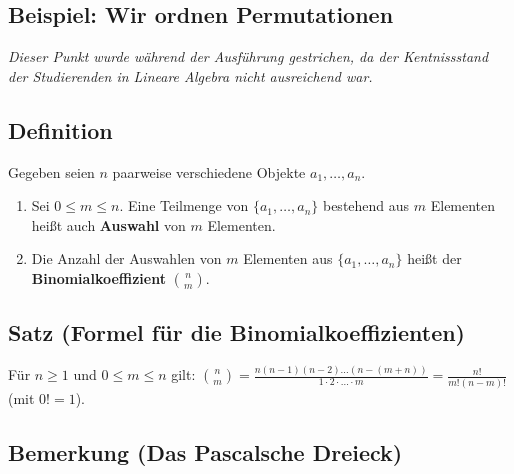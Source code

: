 	
\subsection[Beispiel]{Beispiel: Wir ordnen Permutationen}

	\textit{Dieser Punkt wurde während der Ausführung gestrichen, 
	da der Kentnissstand der Studierenden in Lineare Algebra nicht ausreichend war.}
	
	
\subsection{Definition}

	Gegeben seien $n$ paarweise verschiedene Objekte $a_1,\dots,a_n$.
	
	\begin{enumerate}
	\item Sei $0\leq m \leq n$. Eine Teilmenge von $\{a_1,\dots,a_n\}$ bestehend aus $m$ Elementen heißt auch
	\textbf{Auswahl} von $m$ Elementen.
	
	\item Die Anzahl der Auswahlen von $m$ Elementen aus $\{a_1,\dots,a_n\}$ heißt der 
	\textbf{Binomialkoeffizient} ${n \choose m}$.
	
	\end{enumerate}


\subsection[Formel für die Binomialkoeffizienten]{Satz (Formel für die Binomialkoeffizienten)}

	Für $n\geq 1$ und $0\leq m \leq n$ gilt: 
	${n \choose m}=\frac{n(n-1)(n-2)\ldots (n-(m+n))}{1\cdot 2\cdot \ldots \cdot m}=\frac{n!}{m!(n-m)!}$
	(mit $0!=1$).
	
	
\subsection[Das Pascalsche Dreieck]{Bemerkung (Das Pascalsche Dreieck)}

